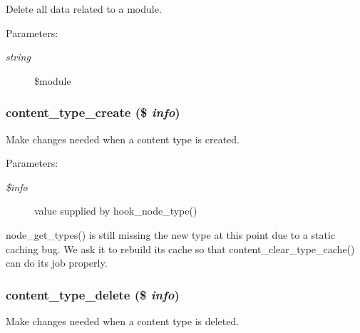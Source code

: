 Delete all data related to a module.

\begin{Desc}
\item[Parameters:]
\begin{description}
\item[{\em string}]\$module \end{description}
\end{Desc}
\hypertarget{content_8crud_8inc_132f9ba2a0c09f24076af987271a4de1}{
\subsubsection[{content\_\-type\_\-create}]{\setlength{\rightskip}{0pt plus 5cm}content\_\-type\_\-create (\$ {\em info})}}
\label{content_8crud_8inc_132f9ba2a0c09f24076af987271a4de1}


Make changes needed when a content type is created.

\begin{Desc}
\item[Parameters:]
\begin{description}
\item[{\em \$info}]value supplied by hook\_\-node\_\-type()\end{description}
\end{Desc}
node\_\-get\_\-types() is still missing the new type at this point due to a static caching bug. We ask it to rebuild its cache so that content\_\-clear\_\-type\_\-cache() can do its job properly. \hypertarget{content_8crud_8inc_a7b16645597242007c1b311d912772dc}{
\subsubsection[{content\_\-type\_\-delete}]{\setlength{\rightskip}{0pt plus 5cm}content\_\-type\_\-delete (\$ {\em info})}}
\label{content_8crud_8inc_a7b16645597242007c1b311d912772dc}


Make changes needed when a content type is deleted.

